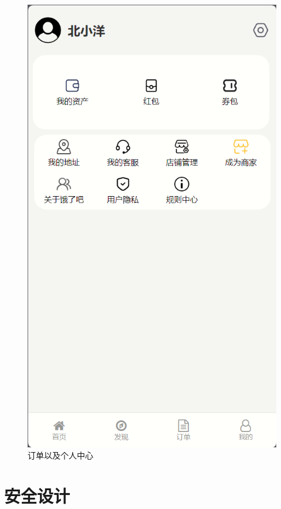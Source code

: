 \begin{figure}[h]
\begin{minipage}[b]{0.3\linewidth}
        \includegraphics[width=\linewidth]{uiFigs/个人中心.png}
     \end{minipage}
     
    \caption{订单以及个人中心}
    \label{fig:ym2}
\end{figure}



\section{安全设计}
